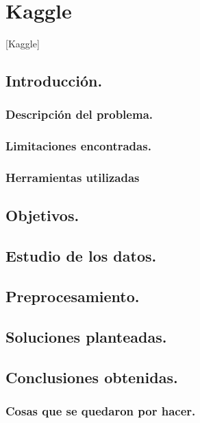 \chapter{Kaggle}[Kaggle]
\section{Introducción.}
\subsection{Descripción del problema.}
\subsection{Limitaciones encontradas.}
\subsection{Herramientas utilizadas}
\section{Objetivos.}
\section{Estudio de los datos.}
\section{Preprocesamiento.}
\section{Soluciones planteadas.}
\section{Conclusiones obtenidas.}
\subsection{Cosas que se quedaron por hacer.}
